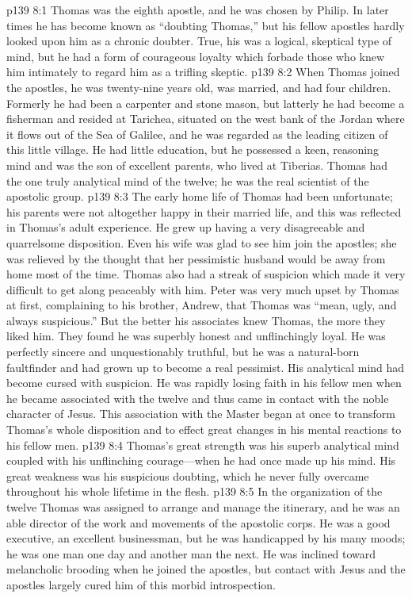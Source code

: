 \vs p139 8:1 Thomas was the eighth apostle, and he was chosen by Philip. In later times he has become known as “doubting Thomas,” but his fellow apostles hardly looked upon him as a chronic doubter. True, his was a logical, skeptical type of mind, but he had a form of courageous loyalty which forbade those who knew him intimately to regard him as a trifling skeptic.
\vs p139 8:2 When Thomas joined the apostles, he was twenty\hyp{}nine years old, was married, and had four children. Formerly he had been a carpenter and stone mason, but latterly he had become a fisherman and resided at Tarichea, situated on the west bank of the Jordan where it flows out of the Sea of Galilee, and he was regarded as the leading citizen of this little village. He had little education, but he possessed a keen, reasoning mind and was the son of excellent parents, who lived at Tiberias. Thomas had the one truly analytical mind of the twelve; he was the real scientist of the apostolic group.
\vs p139 8:3 The early home life of Thomas had been unfortunate; his parents were not altogether happy in their married life, and this was reflected in Thomas’s adult experience. He grew up having a very disagreeable and quarrelsome disposition. Even his wife was glad to see him join the apostles; she was relieved by the thought that her pessimistic husband would be away from home most of the time. Thomas also had a streak of suspicion which made it very difficult to get along peaceably with him. Peter was very much upset by Thomas at first, complaining to his brother, Andrew, that Thomas was “mean, ugly, and always suspicious.” But the better his associates knew Thomas, the more they liked him. They found he was superbly honest and unflinchingly loyal. He was perfectly sincere and unquestionably truthful, but he was a natural\hyp{}born faultfinder and had grown up to become a real pessimist. His analytical mind had become cursed with suspicion. He was rapidly losing faith in his fellow men when he became associated with the twelve and thus came in contact with the noble character of Jesus. This association with the Master began at once to transform Thomas’s whole disposition and to effect great changes in his mental reactions to his fellow men.
\vs p139 8:4 Thomas’s great strength was his superb analytical mind coupled with his unflinching courage---when he had once made up his mind. His great weakness was his suspicious doubting, which he never fully overcame throughout his whole lifetime in the flesh.
\vs p139 8:5 In the organization of the twelve Thomas was assigned to arrange and manage the itinerary, and he was an able director of the work and movements of the apostolic corps. He was a good executive, an excellent businessman, but he was handicapped by his many moods; he was one man one day and another man the next. He was inclined toward melancholic brooding when he joined the apostles, but contact with Jesus and the apostles largely cured him of this morbid introspection.
